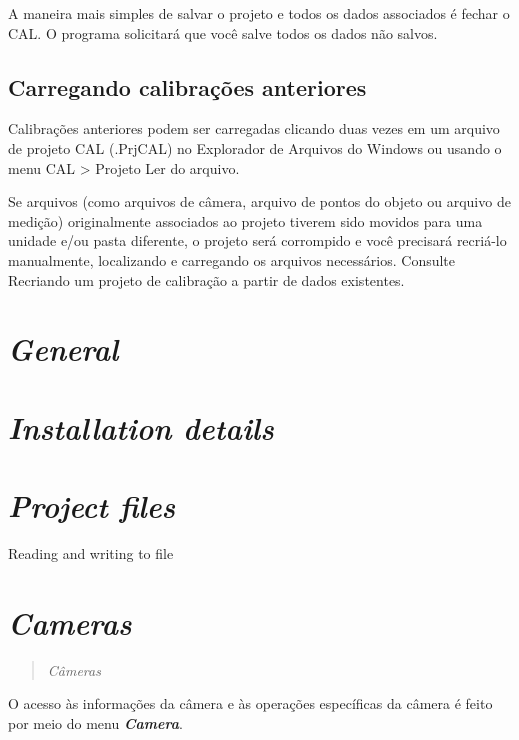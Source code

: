 \documentclass[
  12pt,
  letterpaper,
  DIV=11,
  numbers=noendperiod]{scrreprt}
\begin{document}
A maneira mais simples de salvar o projeto e todos os dados associados é
fechar o CAL. O programa solicitará que você salve todos os dados não
salvos.

\subsection{Carregando calibrações
anteriores}\label{carregando-calibrauxe7uxf5es-anteriores-1}

Calibrações anteriores podem ser carregadas clicando duas vezes em um
arquivo de projeto CAL (.PrjCAL) no Explorador de Arquivos do Windows ou
usando o menu CAL \textgreater{} Projeto \textbar{} Ler do arquivo.

Se arquivos (como arquivos de câmera, arquivo de pontos do objeto ou
arquivo de medição) originalmente associados ao projeto tiverem sido
movidos para uma unidade e/ou pasta diferente, o projeto será corrompido
e você precisará recriá-lo manualmente, localizando e carregando os
arquivos necessários. Consulte Recriando um projeto de calibração a
partir de dados existentes.

\section{\texorpdfstring{\emph{General}}{General}}\label{general-1}

\section{\texorpdfstring{\emph{Installation
details}}{Installation details}}\label{installation-details-1}

\section{\texorpdfstring{\emph{Project
files}}{Project files}}\label{project-files-1}

Reading and writing to file

\section{\texorpdfstring{\emph{Cameras}}{Cameras}}\label{cameras}

\begin{quote}
\emph{Câmeras}
\end{quote}

O acesso às informações da câmera e às operações específicas da câmera é
feito por meio do menu \textbf{\emph{Camera}}.
\end{document}
